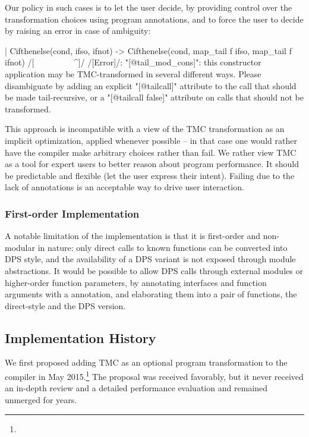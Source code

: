 Our policy in such cases is to let the user decide, by providing
control over the transformation choices using \ocaml{[@tailcall]}
program annotations, and to force the user to decide by raising an
error in case of ambiguity:
\begin{Ocaml}
  | Cifthenelse(cond, ifso, ifnot) ->
      Cifthenelse(cond, map_tail f ifso, map_tail f ifnot)
      /[^^^^^^^^^^^^^^^^^^^^^^^^^^^^^^^^^^^^^^^^^^^^^^^^^^^^]/
/[Error]/: "[@tail_mod_cons]": this constructor application may be TMC-transformed
       in several different ways. Please disambiguate by adding an explicit
       "[@tailcall]" attribute to the call that should be made tail-recursive,
       or a "[@tailcall false]" attribute on calls that should not be
       transformed.
\end{Ocaml}

This approach is incompatible with a view of the TMC
transformation as an implicit optimization, applied whenever
possible -- in that case one would rather have the compiler make
arbitrary choices rather than fail. We rather view TMC as a tool for
expert users to better reason about program performance. It should be
predictable and flexible (let the user express
their intent). Failing due to the lack of annotations is an acceptable way
to drive user interaction.

\subsubsection{First-order Implementation}\label{subsubsec:first-order}
A notable limitation of the \OCaml implementation is that it is first-order and non-modular in nature: only direct calls to known functions can be converted into DPS style, and the availability of a DPS variant is not exposed through module abstractions.
It would be possible to allow DPS calls through external modules or higher-order function parameters, by annotating interfaces and function arguments with a  annotation, and elaborating them into a pair of functions, the direct-style and the DPS version.

\subsection{Implementation History}
\label{subsec:PR-history}

We first proposed adding TMC as an optional program transformation to
the \OCaml compiler in
May 2015.\footnote{}
The proposal was received favorably, but it never received an in-depth
review and a detailed performance evaluation and remained unmerged for
years.

